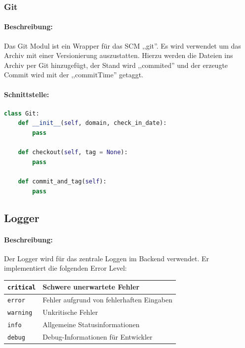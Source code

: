 \subsubsection{Git}
\label{ssub:git}
\paragraph{Beschreibung:}
\label{par:beschreibung_}
Das Git Modul ist ein Wrapper für das SCM ,,git''. Es wird verwendet um das Archiv mit einer Versionierung auszustatten. Hierzu werden 
die Dateien ins Archiv per Git hinzugefügt, der Stand wird ,,commited''
und der erzeugte Commit wird mit der ,,commitTime'' getaggt.

\paragraph{Schnittstelle:}
\label{par:schnittstelle_}
\begin{lstlisting}[language=python]
class Git:
    def __init__(self, domain, check_in_date):
        pass

    def checkout(self, tag = None):
        pass

    def commit_and_tag(self):
        pass
\end{lstlisting}

\subsection{Logger}
\paragraph{Beschreibung:}
\label{par:beschreibung}


\label{sub:logger}
Der Logger wird für das zentrale Loggen im Backend verwendet. Er implementiert die folgenden Error Level:

\begin{table}[h]
\centering
\begin{tabular}{|l|l|}
    \hline
    \texttt{critical} & Schwere unerwartete Fehler \\
    \hline
    \texttt{error} & Fehler aufgrund von fehlerhaften Eingaben \\
    \hline
    \texttt{warning} & Unkritische Fehler \\
    \hline
    \texttt{info} & Allgemeine Statusinformationen \\
    \hline
    \texttt{debug} & Debug-Informationen für Entwickler \\
    \hline
\end{tabular} 
\end{table}


